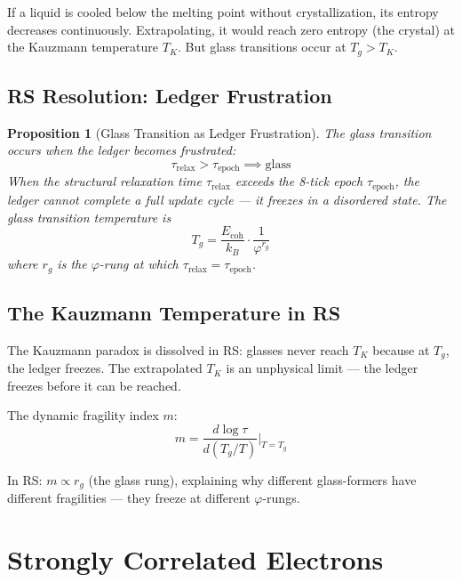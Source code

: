\documentclass[12pt,a4paper]{article}
\newtheorem{proposition}[theorem]{Proposition}
\theoremstyle{definition}
\theoremstyle{remark}
\begin{document}
If a liquid is cooled below the melting point without crystallization, its entropy 
decreases continuously. Extrapolating, it would reach zero entropy (the crystal) 
at the Kauzmann temperature $T_K$. But glass transitions occur at $T_g > T_K$.

\subsection{RS Resolution: Ledger Frustration}

\begin{proposition}[Glass Transition as Ledger Frustration]
The glass transition occurs when the ledger becomes frustrated:
\begin{equation}
\tau_\mathrm{relax} > \tau_\mathrm{epoch} \implies \text{glass}
\end{equation}
When the structural relaxation time $\tau_\mathrm{relax}$ exceeds the 8-tick epoch $\tau_\mathrm{epoch}$, 
the ledger cannot complete a full update cycle --- it freezes in a disordered state.
The glass transition temperature is
\begin{equation}
T_g = \frac{E_\mathrm{coh}}{k_B} \cdot \frac{1}{\varphi^{r_g}}
\end{equation}
where $r_g$ is the $\varphi$-rung at which $\tau_\mathrm{relax} = \tau_\mathrm{epoch}$.
\end{proposition}

\subsection{The Kauzmann Temperature in RS}

The Kauzmann paradox is dissolved in RS: glasses never reach $T_K$ because at 
$T_g$, the ledger freezes. The extrapolated $T_K$ is an unphysical limit — the 
ledger freezes before it can be reached.

The dynamic fragility index $m$:
\begin{equation}
m = \frac{d \log \tau}{d(T_g/T)}\bigg|_{T = T_g}
\end{equation}

In RS: $m \propto r_g$ (the glass rung), explaining why different glass-formers 
have different fragilities — they freeze at different $\varphi$-rungs.

\section{Strongly Correlated Electrons}
\end{document}
